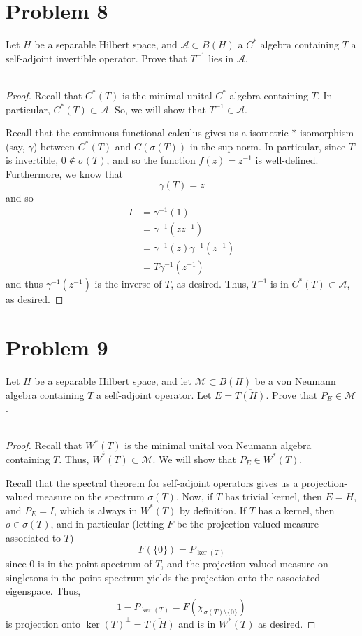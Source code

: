 \documentclass[fontsize=11pt]{scrartcl} %
\numberwithin{equation}{section} %
\numberwithin{figure}{section} %
\numberwithin{table}{section} %
\begin{document}
\section*{Problem 8}
Let $H$ be a separable Hilbert space, and $\mathscr{A}\subset B(H)$ a $C^*$
algebra containing $T$ a self-adjoint invertible operator. Prove that $T^{-1}$
lies in $\mathscr{A}$.
\\
\\
\begin{proof}
    Recall that $C^*(T)$ is the minimal unital $C^*$ algebra containing $T$.
    In particular, $C^*(T)\subset \mathscr{A}$. So, we will show that
    $T^{-1}\in\mathscr{A}$.

    Recall that the continuous functional calculus gives us a isometric
    $*$-isomorphism (say, $\gamma$) between $C^*(T)$ and $C(\sigma(T))$ in the
    sup norm. In particular, since $T$ is invertible, $0\not\in\sigma(T)$, and
    so the function $f(z) = z^{-1}$ is well-defined. Furthermore, we know that
    \[
        \gamma(T)=z
    \]
    and so
    \[
\begin{aligned}
    I &= \gamma^{-1}(1)\\
    &= \gamma^{-1}(zz^{-1})\\
    &= \gamma^{-1}(z)\gamma^{-1}(z^{-1})\\
    &= T\gamma^{-1}(z^{-1})
\end{aligned}
    \]
    and thus $\gamma^{-1}(z^{-1})$ is the inverse of $T$, as desired. Thus,
    $T^{-1}$ is in $C^*(T)\subset\mathscr{A}$, as desired.
\end{proof}

\newpage

\section*{Problem 9}
Let $H$ be a separable Hilbert space, and let $\mathscr{M}\subset B(H)$ be a von
Neumann algebra containing $T$ a self-adjoint operator. Let $E=\overline{T(H)}$.
Prove that $P_E\in \mathscr{M}$.
\\
\\
\begin{proof}
    Recall that $W^*(T)$ is the minimal unital von Neumann algebra containing $T$.
    Thus, $W^*(T)\subset \mathscr{M}$. We will show that $P_E\in W^*(T)$.

    Recall that the spectral theorem for self-adjoint operators gives us a
    projection-valued measure on the spectrum $\sigma(T)$. Now, if $T$ has
    trivial kernel, then $E=H$, and $P_E=I$, which is always in $W^*(T)$ by
    definition. If $T$ has a kernel, then $o\in\sigma(T)$, and in particular
    (letting $F$ be the projection-valued measure associated to $T$)
    \[
        F(\{0\}) = P_{\ker(T)}
    \]
    since $0$ is in the point spectrum of $T$, and the projection-valued measure
    on singletons in the point spectrum yields the projection onto the
    associated eigenspace. Thus,
    \[
        1-P_{\ker(T)} = F(\chi_{\sigma(T)\setminus\{0\}})
    \]
    is projection onto $\ker(T)^{\perp} = \overline{T(H)}$ and is in $W^*(T)$ as
    desired.
\end{proof}
\end{document}
